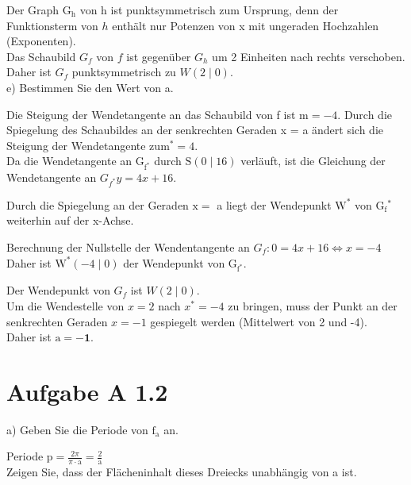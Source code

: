 \documentclass[10pt]{article}
\begin{document}
Der Graph $\mathrm{G}_{\mathrm{h}}$ von h ist punktsymmetrisch zum Ursprung, denn der\\
Funktionsterm von $h$ enthält nur Potenzen von x mit ungeraden Hochzahlen (Exponenten).\\
Das Schaubild $G_{f}$ von $f$ ist gegenüber $G_{h}$ um 2 Einheiten nach rechts verschoben. Daher ist $G_{f}$ punktsymmetrisch zu $W(2 \mid 0)$.\\
e) Bestimmen Sie den Wert von a.

Die Steigung der Wendetangente an das Schaubild von f ist $\mathrm{m}=-4$. Durch die Spiegelung des Schaubildes an der senkrechten Geraden x = a ändert sich die Steigung der Wendetangente $\mathrm{zu} \mathrm{m}^{*}=4$.\\
Da die Wendetangente an $\mathrm{G}_{\mathrm{f}^{*}}$ durch $\mathrm{S}(0 \mid 16)$ verläuft, ist die Gleichung der Wendetangente an $G_{f^{*}} y=4 x+16$.

Durch die Spiegelung an der Geraden $\mathrm{x}=$ a liegt der Wendepunkt $\mathrm{W}^{*}$ von $\mathrm{G}_{\mathrm{f}}{ }^{*}$ weiterhin auf der x-Achse.

Berechnung der Nullstelle der Wendentangente an $G_{f}: 0=4 x+16 \Leftrightarrow x=-4$ Daher ist $\mathrm{W}^{*}(-4 \mid 0)$ der Wendepunkt von $\mathrm{G}_{\mathrm{f}^{*}}$.

Der Wendepunkt von $G_{f}$ ist $W(2 \mid 0)$.\\
Um die Wendestelle von $x=2$ nach $x^{*}=-4$ zu bringen, muss der Punkt an der senkrechten Geraden $x=-1$ gespiegelt werden (Mittelwert von 2 und -4).\\
Daher ist $\mathrm{a}=\mathbf{- 1}$.

\section*{Aufgabe A 1.2}
a) Geben Sie die Periode von $\mathrm{f}_{\mathrm{a}}$ an.

Periode $\mathrm{p}=\frac{2 \pi}{\pi \cdot \mathrm{a}}=\frac{2}{\mathrm{a}}$\\
Zeigen Sie, dass der Flächeninhalt dieses Dreiecks unabhängig von a ist.
\end{document}
